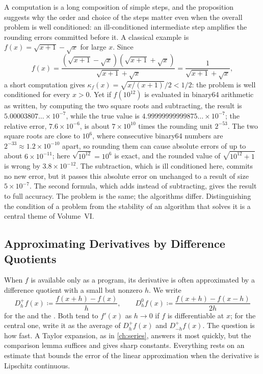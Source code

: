A computation is a long composition of simple steps, and the proposition suggests why the order and choice of the steps matter even when the overall problem is well conditioned: an ill-conditioned intermediate step amplifies the rounding errors committed before it. A classical example is $f(x)=\sqrt{x+1}-\sqrt x$ for large $x$. Since
\[
f(x)=\frac{(\sqrt{x+1}-\sqrt x)(\sqrt{x+1}+\sqrt x)}{\sqrt{x+1}+\sqrt x}=\frac1{\sqrt{x+1}+\sqrt x},
\]
a short computation gives $\kappa_f(x)=\sqrt{x/(x+1)}/2<1/2$: the problem is well conditioned for every $x>0$. Yet if $f(10^{12})$ is evaluated in binary64 arithmetic as written, by computing the two square roots and subtracting, the result is $5.00003807\ldots\times10^{-7}$, while the true value is $4.99999999999875\ldots\times10^{-7}$; the relative error, $7.6\times10^{-6}$, is about $7\times10^{10}$ times the rounding unit $2^{-53}$. The two square roots are close to $10^6$, where consecutive binary64 numbers are $2^{-33}\approx1.2\times10^{-10}$ apart, so rounding them can cause absolute errors of up to about $6\times10^{-11}$; here $\sqrt{10^{12}}=10^6$ is exact, and the rounded value of $\sqrt{10^{12}+1}$ is wrong by $3.8\times10^{-12}$. The subtraction, which is ill conditioned here, commits no new error, but it passes this absolute error on unchanged to a result of size $5\times10^{-7}$. The second formula, which adds instead of subtracting, gives the result to full accuracy. The problem is the same; the algorithms differ. Distinguishing the condition of a problem from the stability of an algorithm that solves it is a central theme of Volume~VI.

\subsection{Approximating Derivatives by Difference Quotients}

When $f$ is available only as a program, its derivative is often approximated by a difference quotient with a small but nonzero $h$. We write
\[
D_h^+f(x)\coloneqq\frac{f(x+h)-f(x)}h,\qquad D_h^0f(x)\coloneqq\frac{f(x+h)-f(x-h)}{2h}
\]
for the  and the . Both tend to $f'(x)$ as $h\to0$ if $f$ is differentiable at $x$; for the central one, write it as the average of $D_h^+f(x)$ and $D_{-h}^+f(x)$. The question is how fast. A Taylor expansion, as in \cref{ch:series}, answers it most quickly, but the comparison lemma suffices and gives sharp constants. Everything rests on an estimate that bounds the error of the linear approximation when the derivative is Lipschitz continuous.

